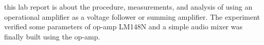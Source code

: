 this lab report is about the procedure, measurements, and analysis of using an operational amplifier as a voltage follower or summing amplifier. The experiment verified some parameters of op-amp LM148N and a simple audio mixer was finally built using the op-amp.